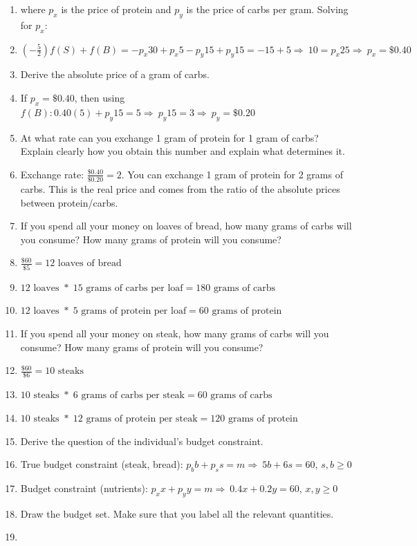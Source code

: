 \documentclass{article}
\begin{document}
\begin{enumerate}
\begin{enumerate}
\item[] where $p_x$ is the price of protein and $p_y$ is the price of carbs per gram. Solving for $p_x$:
\item[] $(-\frac{5}{2})f(S)+f(B)=-p_x30+p_x5-p_y15+p_y15=-15+5 \Rightarrow\ 10=p_x25\Rightarrow\ p_x=\$0.40$
\item Derive the absolute price of a gram of carbs.
\item[] If $p_x=\$0.40$, then using $f(B):0.40(5)+p_y15=5\Rightarrow\ p_y15=3\Rightarrow\ p_y=\$0.20$
\item At what rate can you exchange 1 gram of protein for 1 gram of carbs? Explain clearly how you obtain this number and explain what determines it.
\item[] Exchange rate: $\frac{\$0.40}{\$0.20}=2$. You can exchange 1 gram of protein for 2 grams of carbs. This is the real price and comes from the ratio of the absolute prices between protein/carbs.
\item If you spend all your money on loaves of bread, how many grams of carbs will you consume? How many grams of protein will you consume?
\item[] $\frac{\$60}{\$5}=12\text{ loaves of bread}$
\item[] $12\text{ loaves }*\;15\text{ grams of carbs per loaf}=180\text{ grams of carbs}$
\item[] $12\text{ loaves }*\;5\text{ grams of protein per loaf}=60\text{ grams of protein}$
\item If you spend all your money on steak, how many grams of carbs will you consume? How many grams of protein will you consume?
\item[] $\frac{\$60}{\$6}=10\text{ steaks}$
\item[] $10\text{ steaks }*\;6\text{ grams of carbs per steak}=60\text{ grams of carbs}$
\item[] $10\text{ steaks }*\;12\text{ grams of protein per steak}=120\text{ grams of protein}$
\item Derive the question of the individual's budget constraint.
\item[] True budget constraint (steak, bread): $p_bb+p_ss=m \Rightarrow\ 5b+6s= 60$, $s,b\geq0$
\item[] Budget constraint (nutrients): $p_xx+p_yy= m\Rightarrow\ 0.4x+0.2y= 60$, $x,y\geq0$
\item Draw the budget set. Make sure that you label all the relevant quantities.
\item[] 
\begin{tikzpicture}

\end{tikzpicture}
\end{enumerate}
\end{enumerate}
\end{document}
